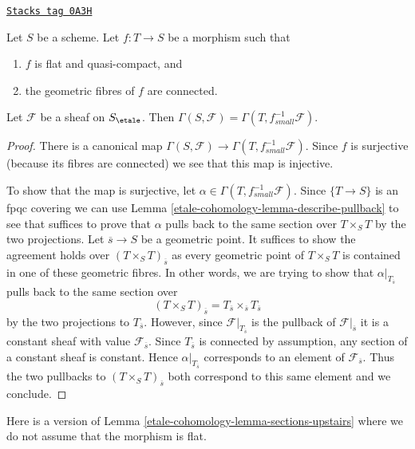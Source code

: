 \begin{lemma}
\label{etale-cohomology-lemma-sections-upstairs}
\href{https://stacks.math.columbia.edu/tag/0A3H}{\texttt{Stacks tag 0A3H}}

Let $S$ be a scheme. Let $f : T \to S$ be a morphism such that
\begin{enumerate}
\item $f$ is flat and quasi-compact, and
\item the geometric fibres of $f$ are connected.
\end{enumerate}
Let $\mathcal{F}$ be a sheaf on $S_\etale$.
Then $\Gamma(S, \mathcal{F}) = \Gamma(T, f^{-1}_{small}\mathcal{F})$.
\end{lemma}

\begin{proof}
There is a canonical map
$\Gamma(S, \mathcal{F}) \to \Gamma(T, f_{small}^{-1}\mathcal{F})$.
Since $f$ is surjective (because its fibres are connected) we see that
this map is injective.

\medskip\noindent
To show that the map is surjective, let
$\alpha \in \Gamma(T, f_{small}^{-1}\mathcal{F})$.
Since $\{T \to S\}$ is an fpqc covering we can use
Lemma \ref{etale-cohomology-lemma-describe-pullback} to see that suffices to prove that
$\alpha$ pulls back to the same section over $T \times_S T$ by the
two projections. Let $\overline{s} \to S$ be a geometric point.
It suffices to show the agreement holds over $(T \times_S T)_{\overline{s}}$
as every geometric point of $T \times_S T$ is contained in one of
these geometric fibres. In other words, we are trying to show that
$\alpha|_{T_{\overline{s}}}$ pulls back to the same section over
$$
(T \times_S T)_{\overline{s}} =
T_{\overline{s}} \times_{\overline{s}} T_{\overline{s}}
$$
by the two projections to $T_{\overline{s}}$.
However, since $\mathcal{F}|_{T_{\overline{s}}}$ is the
pullback of $\mathcal{F}|_{\overline{s}}$ it is a constant sheaf
with value $\mathcal{F}_{\overline{s}}$. Since $T_{\overline{s}}$
is connected by assumption, any section of a constant sheaf is constant.
Hence $\alpha|_{T_{\overline{s}}}$ corresponds to an element
of $\mathcal{F}_{\overline{s}}$. Thus the two pullbacks to
$(T \times_S T)_{\overline{s}}$ both
correspond to this same element and we conclude.
\end{proof}

Here is a version of Lemma \ref{etale-cohomology-lemma-sections-upstairs}
where we do not assume that the morphism is flat.


